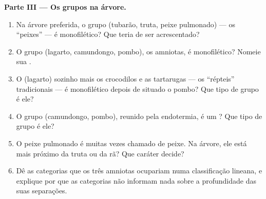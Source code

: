 \begin{problem}
\medskip
\noindent\textbf{Parte III --- Os grupos na árvore.}
\begin{enumerate}[resume]
  \item Na árvore preferida, o grupo (tubarão, truta, peixe pulmonado)
        --- os ``peixes'' --- é monofilético? Que  teria de ser
        acrescentado?
  \item O grupo (lagarto, camundongo, pombo), os amniotas, é
        monofilético? Nomeie sua .
  \item O (lagarto) sozinho mais os crocodilos e as tartarugas --- os
        ``répteis'' tradicionais --- é monofilético depois de situado o
        pombo? Que tipo de grupo é ele?
  \item O grupo (camundongo, pombo), reunido pela endotermia, é um
        ? Que tipo de grupo é ele?
  \item O peixe pulmonado é muitas vezes chamado de peixe. Na árvore,
        ele está mais próximo da truta ou da rã? Que caráter decide?
  \item Dê as categorias que os três amniotas ocupariam numa
        classificação lineana, e explique por que as categorias não
        informam nada sobre a profundidade das suas separações.
\end{enumerate}


\end{problem}
